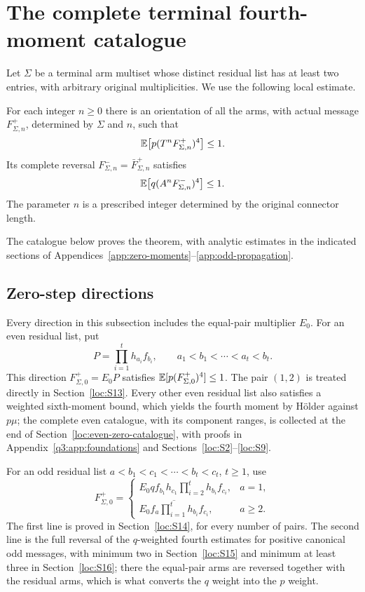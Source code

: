 \section{The complete terminal fourth-moment catalogue}\label{sec:terminals}
Let $\Sigma$ be a terminal arm multiset whose distinct residual list has at least two entries, with arbitrary original multiplicities. We use the following local estimate.

\begin{theorem}\label{thm:terminal}
For each integer $n\ge0$ there is an orientation of all the arms, with actual message $F^+_{\Sigma,n}$, determined by $\Sigma$ and $n$, such that
\begin{equation}\label{eq:terminalplus}
 \mathbb E\bigl[p(T^nF^+_{\Sigma,n})^4\bigr]\le1.
\end{equation}
Its complete reversal $F^-_{\Sigma,n}=\bar F^+_{\Sigma,n}$ satisfies
\begin{equation}\label{eq:terminalminus}
 \mathbb E\bigl[q(A^nF^-_{\Sigma,n})^4\bigr]\le1.
\end{equation}
The parameter $n$ is a prescribed integer determined by the original connector length.
\end{theorem}

The catalogue below proves the theorem, with analytic estimates in the indicated sections of Appendices~\ref{app:zero-moments}--\ref{app:odd-propagation}.

\subsection{Zero-step directions}
Every direction in this subsection includes the equal-pair multiplier $E_0$. For an even residual list, put
\[
 P=\prod_{i=1}^t h_{a_i}f_{b_i},\qquad
 a_1<b_1<\cdots<a_t<b_t.
\]
This direction $F^+_{\Sigma,0}=E_0P$ satisfies $\mathbb E[p(F^+_{\Sigma,0})^4]\le1$. The pair $(1,2)$ is treated directly in Section~\ref{loc:S13}. Every other even residual list also satisfies a weighted sixth-moment bound, which yields the fourth moment by H\"older against $p\mu$; the complete even catalogue, with its component ranges, is collected at the end of Section~\ref{loc:even-zero-catalogue}, with proofs in Appendix~\ref{q3:app:foundations} and Sections~\ref{loc:S2}--\ref{loc:S9}.

For an odd residual list $a<b_1<c_1<\cdots<b_t<c_t$, $t\ge1$, use
\begin{equation}\label{eq:zeroOdd}
 F^+_{\Sigma,0}=
 \begin{cases}
 E_0 qf_{b_1}h_{c_1}\displaystyle\prod_{i=2}^t h_{b_i}f_{c_i},&a=1,\\[3pt]
 \displaystyle\overline{E_0f_a\prod_{i=1}^t h_{b_i}f_{c_i}},&a\ge2.
 \end{cases}
\end{equation}
The first line is proved in Section~\ref{loc:S14}, for every number of pairs. The second line is the full reversal of the $q$-weighted fourth estimates for positive canonical odd messages, with minimum two in Section~\ref{loc:S15} and minimum at least three in Section~\ref{loc:S16}; there the equal-pair arms are reversed together with the residual arms, which is what converts the $q$ weight into the $p$ weight.

